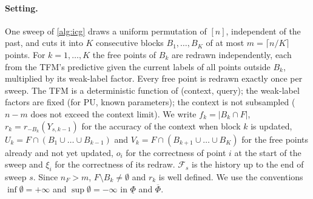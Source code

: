 \paragraph{Setting.} One sweep of \cref{alg:icg} draws a uniform permutation of $[n]$, independent of the past, and cuts
it into $K$ consecutive blocks $B_1,\dots,B_K$ of at most $m=\lceil n/K\rceil$ points. For $k=1,\dots,K$ the free points
of $B_k$ are redrawn independently, each from the TFM's predictive given the current labels of all points outside
$B_k$, multiplied by its weak-label factor. Every free point is redrawn exactly once per sweep. The TFM is a
deterministic function of (context, query); the weak-label factors are fixed (for PU, known parameters); the context is
not subsampled ($n-m$ does not exceed the context limit). We write $f_k=\lvert B_k\cap F\rvert$,
$r_k=r_{-B_k}(Y_{s,k-1})$ for the accuracy of the context when block $k$ is updated, $U_k=F\cap(B_1\cup\dots\cup B_{k-1})$
and $V_k=F\cap(B_{k+1}\cup\dots\cup B_K)$ for the free points already and not yet updated, $o_i$ for the correctness of
point $i$ at the start of the sweep and $\xi_i$ for the correctness of its redraw. $\mathcal F_s$ is the history up to the
end of sweep $s$. Since $n_F>m$, $F\setminus B_k\neq\emptyset$ and $r_k$ is well defined. We use the conventions
$\inf\emptyset=+\infty$ and $\sup\emptyset=-\infty$ in $\underline\Phi$ and $\overline\Phi$.

